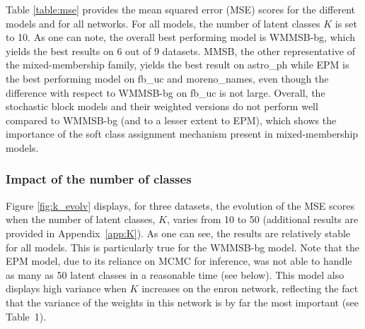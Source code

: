 \begin{table*}[t]
\centering
	
\label{table:mse}
\end{table*}

\begin{figure*}[ht]
\centering
	
   \label{fig:k_evolv}
\end{figure*}

Table \ref{table:mse} provides the mean squared error (MSE) scores for the different models and for all networks. For all models, the number of latent classes $K$ is set to 10.
As one can note, the overall best performing model is WMMSB-bg, which yields the best results on 6 out of 9 datasets. MMSB, the other representative of the mixed-membership family, yields the best result on astro\_ph while EPM is the best performing model on fb\_uc and moreno\_names, even though the difference with respect to WMMSB-bg on fb\_uc is not large. Overall, the stochastic block models and their weighted versions do not perform well compared to WMMSB-bg (and to a lesser extent to EPM), which shows the importance of the soft class assignment mechanism present in mixed-membership models. 


\subsubsection{Impact of the number of classes} 

Figure \ref{fig:k_evolv} displays, for three datasets, the evolution of the MSE scores when the number of latent classes, $K$, varies from 10 to 50  (additional results are provided in Appendix~\ref{app:K}). As one can see, the results are relatively stable for all models. This is particularly true for the WMMSB-bg model. Note that the EPM model, due to its reliance on MCMC for inference, was not able to handle as many as 50 latent classes in a reasonable time (see below). This model also displays high variance when $K$ increases on the enron network, reflecting the fact that the variance of the weights in this network is by far the most important (see Table~1).

